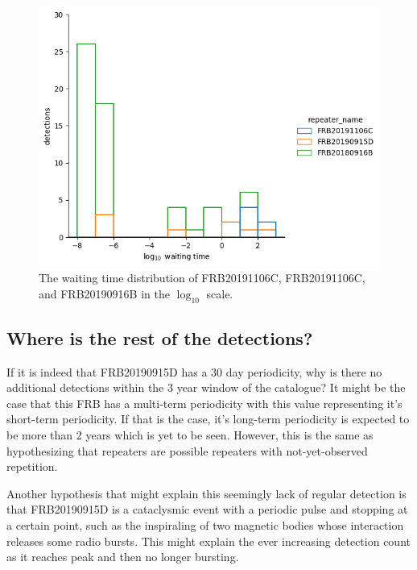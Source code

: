 \documentclass[
  rmp,
  amsmath,
  amssymb,
  preprint]{revtex4-2}
\begin{document}
\begin{figure}

{\centering \includegraphics{./img/waiting.png}

}

\caption{\label{fig-waitingtime}The waiting time distribution of
FRB20191106C, FRB20191106C, and FRB20190916B in the \(\log_{10}\)
scale.}

\end{figure}

\hypertarget{sec-why-30}{%
\subsection{Where is the rest of the detections?}\label{sec-why-30}}

If it is indeed that FRB20190915D has a 30 day periodicity, why is there
no additional detections within the 3 year window of the catalogue? It
might be the case that this FRB has a multi-term periodicity with this
value representing it's short-term periodicity. If that is the case,
it's long-term periodicity is expected to be more than 2 years which is
yet to be seen. However, this is the same as hypothesizing that
repeaters are possible repeaters with not-yet-observed repetition.

Another hypothesis that might explain this seemingly lack of regular
detection is that FRB20190915D is a cataclysmic event with a periodic
pulse and stopping at a certain point, such as the inspiraling of two
magnetic bodies whose interaction releases some radio bursts. This might
explain the ever increasing detection count as it reaches peak and then
no longer bursting.
\end{document}
